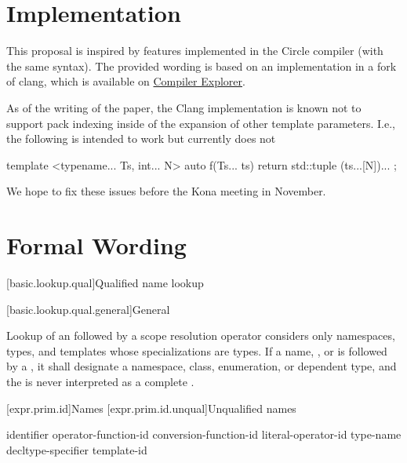 \documentclass{wg21}
\begin{document}
\section{Implementation}

This proposal is inspired by features implemented in the Circle compiler (with the same syntax).
The provided wording is based on an implementation in a fork of clang, which is available on \href{https://compiler-explorer.com/z/WKobTEq6x}{Compiler Explorer}.

As of the writing of the paper, the Clang implementation is known not to support pack indexing inside of the expansion of other template parameters.
I.e., the following is intended to work but currently does not

\begin{colorblock}
template <typename... Ts, int... N>
auto f(Ts... ts) {
    return std::tuple{ (ts...[N])... };
}
\end{colorblock}

We hope to fix these issues before the Kona meeting in November.

\section{Formal Wording}

[basic.lookup.qual]{Qualified name lookup}

[basic.lookup.qual.general]{General}

\pnum
{}%
%
%
Lookup of an 
followed by a \tcode{::} scope resolution operator
considers only
namespaces, types, and templates whose specializations are types.
If a name, ,  or 
is followed by a \tcode{::},
it shall designate a namespace, class, enumeration, or dependent type,
and the \tcode{::} is never interpreted as
a complete .

[expr.prim.id]{Names}
[expr.prim.id.unqual]{Unqualified names}

\begin{bnf}
    \br
    identifier\br
    \br
    operator-function-id\br
    conversion-function-id\br
    literal-operator-id\br
    \terminal{\~} type-name\br
    \terminal{\~} decltype-specifier\br
    \br
    template-id
\end{bnf}
\end{document}
